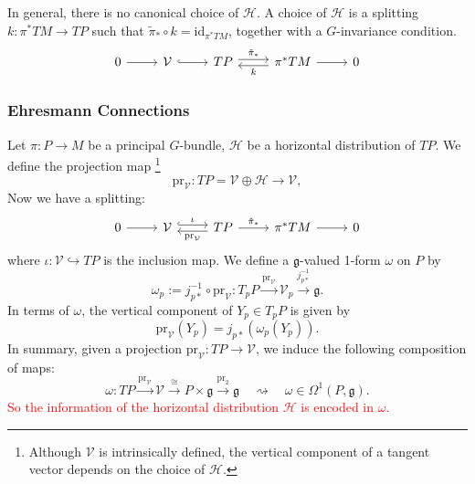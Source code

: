\begin{remark}
In general, there is no canonical choice of $\mathcal{H}$. 
A choice of $\mathcal{H}$ is a splitting $k: \pi^*TM\to TP$ such that $\tilde{\pi}_*\circ k = \mathrm{id}_{\pi^*TM}$, 
together with a $G$-invariance condition. 
\[\begin{tikzcd}
    0 & {\mathcal{V}} & TP & {\pi^*TM} & 0
    \arrow[from=1-1, to=1-2]
    \arrow[hook, from=1-2, to=1-3]
    \arrow["\tilde{\pi}_*", shift left, from=1-3, to=1-4]
    \arrow["k", shift left, from=1-4, to=1-3]
    \arrow[from=1-4, to=1-5]
\end{tikzcd}\]    
\end{remark}

\subsubsection{Ehresmann Connections}
Let $\pi: P\to M$ be a principal $G$-bundle, $\mathcal{H}$ be a horizontal distribution of $TP$. 
We define the projection map \footnote{Although $\mathcal{V}$ is intrinsically defined, 
the vertical component of a tangent vector depends on the choice of $\mathcal{H}$.} 
\begin{equation*}
    \mathrm{pr}_{\mathcal{V}}: TP = \mathcal{V}\oplus\mathcal{H} \to \mathcal{V}, 
\end{equation*}
Now we have a splitting:
\[\begin{tikzcd}
    0 & {\mathcal{V}} & TP & {\pi^*TM} & 0
    \arrow[from=1-1, to=1-2]
    \arrow["\iota", hook, shift left, from=1-2, to=1-3]
    \arrow["\tilde{\pi}_*", from=1-3, to=1-4]
    \arrow["\mathrm{pr}_{\mathcal{V}}", shift left, from=1-3, to=1-2]
    \arrow[from=1-4, to=1-5]
\end{tikzcd}\]
where $\iota: \mathcal{V}\hookrightarrow TP$ is the inclusion map. 
We define a $\mathfrak{g}$-valued 1-form $\omega$ on $P$ by
\begin{equation*}
    \omega_p:= j_{p*}^{-1}\circ \mathrm{pr}_{\mathcal{V}}: 
    T_pP\xrightarrow{\mathrm{pr}_{\mathcal{V}}} \mathcal{V}_p\xrightarrow{j_{p*}^{-1}} \mathfrak{g}.
\end{equation*}
In terms of $\omega$, the vertical component of $Y_p\in T_pP$ is given by 
\begin{equation*}
    \mathrm{pr}_{\mathcal{V}}(Y_p) = j_{p*}(\omega_p(Y_p)).
\end{equation*}
In summary, given a projection $\mathrm{pr}_{\mathcal{V}}: TP\to \mathcal{V}$, we induce the following composition of maps:
\begin{equation*}
    \omega:TP \xrightarrow{\mathrm{pr}_{\mathcal{V}}} \mathcal{V} \xrightarrow{\ \cong\ } P\times\mathfrak{g} \xrightarrow{\mathrm{pr}_2} \mathfrak{g}
    \quad\rightsquigarrow\quad \omega\in\Omega^1(P,\mathfrak{g}).
\end{equation*}
\textcolor{red}{So the information of the horizontal distribution $\mathcal{H}$ is encoded in $\omega$.}


